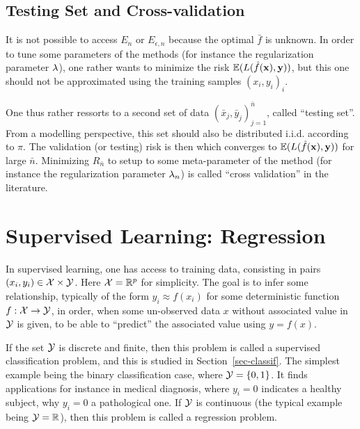 \subsection{Testing Set and Cross-validation}

It is not possible to access $E_n$ or $E_{\epsilon,n}$ because the optimal $\bar f$ is unknown. 
%
In order to tune some parameters of the methods (for instance the regularization parameter $\lambda$), one rather wants to minimize the risk $\mathbb{E}(L(\hat f(\mathrm{\bf x}),\mathrm{\bf y}))$, but this one should not be approximated using the training samples $(x_i,y_i)_i$.

%
One thus rather ressorts to a second set of data $(\bar x_j,\bar y_j)_{j=1}^{\bar n}$, called ``testing set''. From a modelling perspective, this set should also be distributed i.i.d. according to $\pi$. The validation (or testing) risk is then
which converges to $\mathbb{E}(L(\hat f(\mathrm{\bf x}),\mathrm{\bf y}))$ for large $\bar n$.
%
Minimizing $R_{\bar n}$ to setup to some meta-parameter of the method (for instance the regularization parameter $\lambda_n$) is called ``cross validation'' in the literature.


\section{Supervised Learning: Regression}
\label{sec-regression}

In supervised learning, one has access to training data, consisting in pairs $(x_i,y_i) \in \mathcal{X} \times \mathcal{Y}$. Here $\mathcal{X}=\mathbb{R}^p$ for simplicity. The goal is to infer some relationship, typically of the form $y_i \approx f(x_i)$ for some deterministic function $f : \mathcal{X} \rightarrow \mathcal{Y}$, in order, when some un-observed data $x$ without associated value in $\mathcal{Y}$ is given, to be able to ``predict'' the associated value using $y = f(x)$. 

If the set $\mathcal{Y}$ is discrete and finite, then this problem is called a supervised classification problem, and this is studied in Section~\ref{sec-classif}. The simplest example being the binary classification case, where $\mathcal{Y}=\{0,1\}$. It finds applications for instance in medical diagnosis, where $y_i=0$ indicates a healthy subject, why $y_i=0$ a pathological one.
%
If $\mathcal{Y}$ is continuous (the typical example being $\mathcal{Y}=\mathbb{R}$), then this problem is called a regression problem. 

